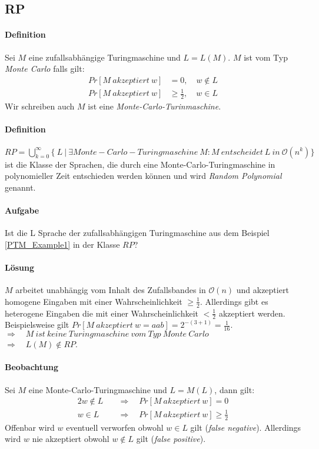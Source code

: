 \subsection{RP}
\paragraph{Definition}
Sei $M$ eine zufallsabhängige Turingmaschine und $L = L(M)$. $M$ ist vom Typ \emph{Monte Carlo} falls gilt:
\begin{align*}
	Pr[M\ akzeptiert\ w] & = 0,\quad w \notin L \\
	Pr[M\ akzeptiert\ w] & \geq \frac{1}{2},\quad w \in L
\end{align*}
Wir schreiben auch $M$ ist eine \emph{Monte-Carlo-Turinmaschine}.

\paragraph{Definition}
$RP = \bigcup\limits_{k=0}^{\infty} \bigl\{\ L\ \bigl\lvert\ \exists Monte-Carlo-Turingmaschine\ M : M\ entscheidet\ L\ in\ \mathcal{O}(n^k) \bigl\}$ ist die Klasse der Sprachen, die durch eine Monte-Carlo-Turingmaschine in polynomieller Zeit entschieden werden können und wird \emph{Random Polynomial} genannt.

\paragraph{Aufgabe}
Ist die L Sprache der zufallsabhängigen Turingmaschine aus dem Beispiel \ref{PTM_Example1} in der Klasse $RP$?

\paragraph{Lösung}
$M$ arbeitet unabhängig vom Inhalt des Zufallsbandes in $\mathcal{O}(n)$ und akzeptiert homogene Eingaben mit einer Wahrscheinlichkeit $\geq \frac{1}{2}$.
Allerdings gibt es heterogene Eingaben die mit einer Wahrscheinlichkeit $< \frac{1}{2}$ akzeptiert werden.
Beispielsweise gilt $Pr[M\ akzeptiert\ w=aab] = 2^{-(3+1)} = \frac{1}{16}$. \\
$\Rightarrow \quad M\ ist\ keine\ Turingmaschine\ vom\ Typ\ Monte\ Carlo$ \\
$\Rightarrow \quad L(M) \notin RP$.

\paragraph{Beobachtung}
Sei $M$ eine Monte-Carlo-Turingmaschine und $L = M(L)$, dann gilt:
\begin{alignat}{2}
	w \notin L \quad & \Rightarrow \quad Pr[M\ akzeptiert\ w] = 0 \\
	w \in L \quad & \Rightarrow \quad Pr[M\ akzeptiert\ w] \geq \frac{1}{2}
\end{alignat}
Offenbar wird $w$ eventuell verworfen obwohl $w \in L$ gilt (\emph{false negative}).
Allerdings wird $w$ nie akzeptiert obwohl $w \notin L$ gilt (\emph{false positive}).

